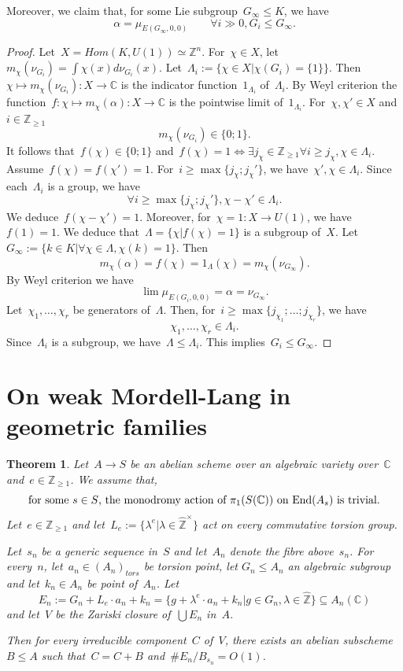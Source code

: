 \documentclass[12pt]{amsart}
\newtheorem{theorem}{Theorem}[section]
\newcommand{\End}{{\rm End}}
\newcommand{\Z}{{\mathbb Z}}
\newcommand{\C}{{\mathbb C}}
\newcommand{\wh}{\widehat}
\begin{document}
Moreover, we claim that, for some Lie subgroup~$G_{\infty}\leq K$, we have
\[
\alpha=\mu_{E(G_\infty,0,0)}\qquad\forall i\gg0, G_i\leq G_\infty.
\]
\begin{proof}Let~$X=Hom(K,U(1))\simeq \Z^n$. For~$\chi\in X$, let~$m_\chi(\nu_{G_i})=\int \chi(x) d\nu_{G_i}(x)$.
Let~$\Lambda_i:=\{\chi\in X|\chi(G_i)=\{1\}\}$. Then~$\chi\mapsto m_\chi(\nu_{G_i}):X\to \C$ is the indicator function~$1_{\Lambda_i}$ of~$\Lambda_i$. By Weyl criterion the function~$f:\chi\mapsto m_\chi(\alpha):X\to \C$ is the pointwise limit of~$1_{\Lambda_i}$. For~$\chi,\chi'\in X$ and~$i\in\Z_{\geq1}$ 
\[
m_\chi(\nu_{G_i})\in\{0;1\}.
\]
It follows that~$f(\chi)\in\{0;1\}$ and~$f(\chi)=1\Leftrightarrow\exists j_{\chi}\in\Z_{\geq1} \forall i\geq j_{\chi}, \chi\in\Lambda_i$.
Assume~$f(\chi)=f(\chi')=1$. For~$i\geq \max\{j_\chi;j_\chi'\}$, we have~$\chi',\chi\in\Lambda_i$.
Since each~$\Lambda_i$ is a group, we have
\[
\forall i\geq \max\{j_\chi;j_\chi'\}, \chi-\chi'\in \Lambda_i.
\]
We deduce~$f(\chi-\chi')=1$. Moreover, for~$\chi=1:X\to U(1)$, we have~$f(1)=1$. We deduce that~$\Lambda=\{\chi|f(\chi)=1\}$ is a subgroup of~$X$. Let~$G_\infty:=\{k\in K|\forall \chi\in\Lambda,\chi(k)=1\}$. Then
\[
m_\chi(\alpha)=f(\chi)=1_{\Lambda}(\chi)=m_\chi(\nu_{G_\infty}).
\]
By Weyl criterion we have
\[
\lim \mu_{E(G_i,0,0)}
=
\alpha
=\nu_{G_{\infty}}.
\]
Let~$\chi_1,\ldots,\chi_r$ be generators of~$\Lambda$. Then, for~$i\geq \max\{j_{\chi_1};\ldots;j_{\chi_r}\}$, we have
\[
\chi_1,\ldots,\chi_r \in \Lambda_i.
\]
Since~$\Lambda_i$ is a subgroup, we have~$\Lambda\leq \Lambda_i$. This implies~$G_i\leq G_{\infty}$.
\end{proof}


\section{On weak Mordell-Lang in geometric families}

\begin{theorem}\label{thm:weak}
Let~$A\to S$ be an abelian scheme over an algebraic variety over~$\C$ and~$e\in\Z_{\geq1}$. We assume that, 
\begin{equation}\label{eq:hypmonodromy}
\text{for some~$s\in S$, the monodromy action of~$\pi_1(S(\C))$ on~$\End(A_s)$ is trivial.}
\end{equation}
Let~$e\in\Z_{\geq1}$ and let~$L_e:=\{\lambda^e|\lambda\in\wh{\Z}^\times\}$ act on every commutative torsion group.

Let~$s_n$ be a generic sequence in~$S$ and  let~$A_n$ denote the fibre above~$s_n$. For every~$n$, let~$a_n\in (A_n)_{tors}$  be torsion point, let $G_n\leq A_n$  an algebraic subgroup and let~$k_n\in A_n$ be point of~$A_n$. Let
\[E_n:=G_n+L_e\cdot a_n+k_n
=\{g+\lambda^e\cdot a_n+k_n|g\in G_n, \lambda\in \wh{\Z}\}\subseteq A_n(\C)
\]
and let~$V$ be the Zariski closure of~$\bigcup E_n$ in~$A$.%

Then for every irreducible component~$C$ of~$V$, there exists an abelian subscheme~$B\leq A$ such that~$C=C+B$
and~$\#E_n/B_{s_n}=O(1)$.
\end{theorem}
\end{document}

